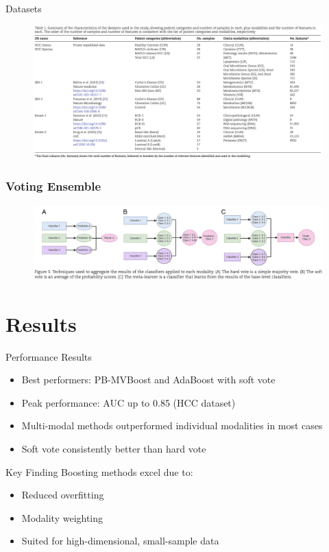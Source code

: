 \documentclass{beamer}
\begin{document}
\begin{frame}{Datasets}
\begin{figure}[H]
  \centering
  \includegraphics[width=1\textwidth]{assets/datasets.png}
\end{figure}
\end{frame}

\begin{frame}
  \frametitle{Voting Ensemble}
  \begin{figure}[H]
    \centering
    \includegraphics[width=1\textwidth]{assets/vote_meta.png}
  \end{figure}
\end{frame}

\section{Results}

\begin{frame}{Performance Results}
\begin{itemize}
\item \alert{Best performers}: PB-MVBoost and AdaBoost with soft vote
\item \alert{Peak performance}: AUC up to 0.85 (HCC dataset)
\item Multi-modal methods \alert{outperformed} individual modalities in most cases
\item \alert{Soft vote consistently better} than hard vote
\end{itemize}

\begin{block}{Key Finding}
Boosting methods excel due to:
\begin{itemize}
\item Reduced overfitting
\item Modality weighting
\item Suited for high-dimensional, small-sample data
\end{itemize}
\end{block}
\end{frame}
\end{document}
